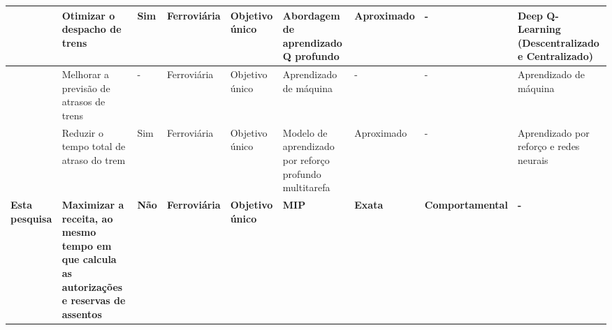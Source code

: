 \begin{center}
\begin{longtable}{|M{2cm}|M{3.7cm}|M{0.5cm}|M{1.1cm}|M{1cm}|M{2cm}|M{1.7cm}|M{1.7cm}|M{1.5cm}|}
		\citep{AGASUCCI2023}      &  Otimizar o despacho de trens                                                                                                                         & Sim                 & Ferroviária          &  Objetivo único          &  Abordagem de aprendizado Q profundo                     & Aproximado                                      & -                        &  Deep Q-Learning (Descentralizado e Centralizado)          \\ \hline
		\citep{SARHANI2024100120} &  Melhorar a previsão de atrasos de trens                                                                                                              & -                   & Ferroviária          &  Objetivo único          &  Aprendizado de máquina                                  & -                                               & -                        &  Aprendizado de máquina                                    \\ \hline
		\citep{TANG2025103900}    &  Reduzir o tempo total de atraso do trem                                                                                                              & Sim                 & Ferroviária          &  Objetivo único          &  Modelo de aprendizado por reforço profundo multitarefa  & Aproximado                                      & -                        &  Aprendizado por reforço e redes neurais                   \\ \hline
		\textbf{Esta pesquisa}    &  \textbf{Maximizar a receita, ao mesmo tempo em que calcula as autorizações e reservas de assentos}                                                   & \textbf{Não}        & \textbf{Ferroviária} &  \textbf{Objetivo único} &  \textbf{MIP}                                            & \textbf{Exata}                                  & \textbf{Comportamental}  & \textbf{-}                                                \\ \hline
	\end{longtable}
\end{center}
